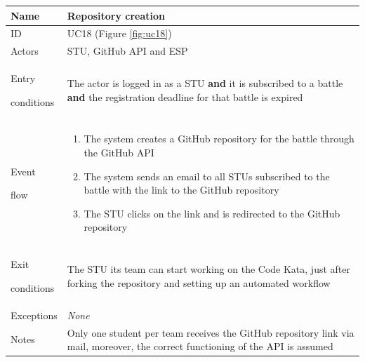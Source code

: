 \begin{center}
    \def\arraystretch{1.5}
    \begin{tabular}{| m{2cm} | m{10cm}|}
        \hline
        Name                  & Repository creation                                                                                                                         \\ \hline
        ID                    & UC18 (Figure \ref{fig:uc18})                                                                                                                \\ \hline
        Actors                & STU, GitHub API and ESP                                                                                                                     \\ \hline
        Entry \par conditions & The actor is logged in as a STU \textbf{and} it is subscribed to a battle \textbf{and} the registration deadline for that battle is expired \\ \hline
        Event \par flow       & \begin{enumerate}
                                    \item The system creates a GitHub repository for the battle through the GitHub API
                                    \item The system sends an email to all STUs subscribed to the battle with the link to the GitHub repository
                                    \item The STU clicks on the link and is redirected to the GitHub repository
                                \end{enumerate}                                                                                                                             \\ \hline
        Exit \par conditions  & The STU its team can start working on the Code Kata, just after forking the repository and setting up an automated workflow                 \\ \hline
        Exceptions            & \textit{None}                                                                                                                               \\ \hline
        Notes                 & Only one student per team receives the GitHub repository link via mail, moreover, the correct functioning of the API is assumed              \\ \hline
    \end{tabular}
\end{center}

